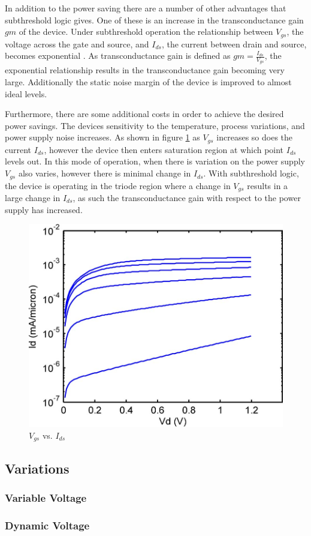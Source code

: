 In addition to the power saving there are a number of other advantages that subthreshold logic gives.
One of these is an increase in the transconductance gain $gm$ of the device.
Under subthreshold operation the relationship between $V_{gs}$, the voltage across the gate and source, and $I_{ds}$, the current between drain and source, becomes exponential \cite{ULPSubThresh}.
As transconductance gain is defined as $gm = \frac{I_{ds}}{V_{gs}}$, the exponential relationship results in the transconductance gain becoming very large.
Additionally the static noise margin of the device is improved to almost ideal levels.

Furthermore, there are some additional costs in order to achieve the desired power savings.
The devices sensitivity to the temperature, process variations, and power supply noise increases.
As shown in figure \ref{fig:VgsIds} as $V_{gs}$ increases so does the current $I_{ds}$, however the device then enters saturation region at which point $I_{ds}$ levels out.
In this mode of operation, when there is variation on the power supply $V_{gs}$ also varies, however there is minimal change in $I_{ds}$.
With subthreshold logic, the device is operating in the triode region where a change in $V_{gs}$ results in a large change in $I_{ds}$, as such the transconductance gain with respect to the power supply has increased.

\begin{figure}
	\centering
	\includegraphics[width=\columnwidth]{../../images/vgsvsids.png}
	\caption{$V_{gs}$ vs. $I_{ds}$ \cite{SemiEmpiricalModels}}
	\label{fig:VgsIds}
\end{figure}

\subsection{Variations}
\subsubsection{Variable Voltage}


\subsubsection{Dynamic Voltage}


